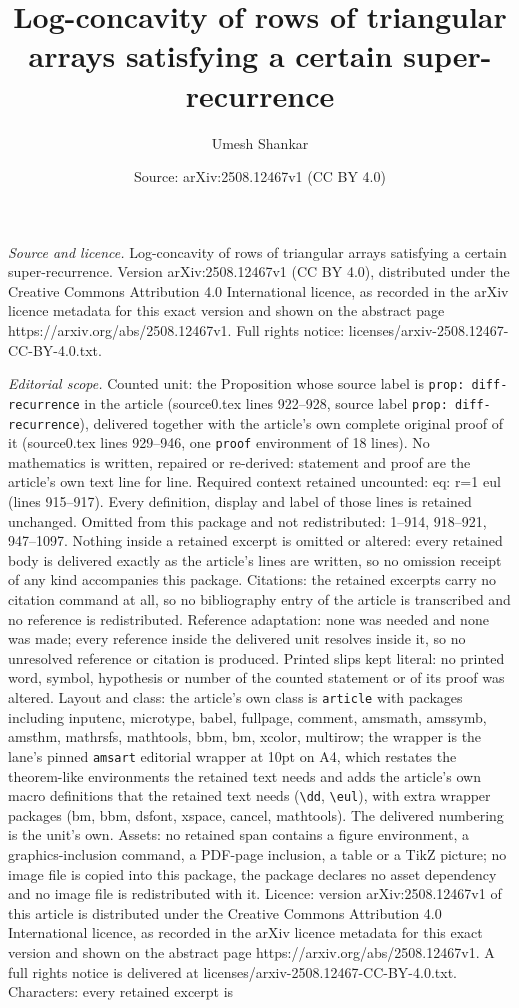 \documentclass[10pt,a4paper]{amsart}
\title[Log-concavity of rows of triangular arrays satisfying a cert]{Log-concavity of rows of triangular arrays satisfying a certain super-recurrence}
\author{Umesh Shankar}
\date{Source: arXiv:2508.12467v1 (CC BY 4.0)}
\begin{document}
\maketitle

\noindent\emph{Source and licence.} Log-concavity of rows of triangular arrays satisfying a certain super-recurrence. Version arXiv:2508.12467v1 (CC BY 4.0), distributed under the Creative Commons Attribution 4.0 International licence, as recorded in the arXiv licence metadata for this exact version and shown on the abstract page https://arxiv.org/abs/2508.12467v1. Full rights notice: licenses/arxiv-2508.12467-CC-BY-4.0.txt.\par\smallskip

\noindent\textit{Editorial scope.} Counted unit: the Proposition whose source label is \texttt{prop: diff-recurrence} in the article (source0.tex lines 922--928, source label \texttt{prop: diff-recurrence}), delivered together with the article's own complete original proof of it (source0.tex lines 929--946, one \texttt{proof} environment of 18 lines). No mathematics is written, repaired or re-derived: statement and proof are the article's own text line for line. Required context retained uncounted: eq: r=1 eul (lines 915--917). Every definition, display and label of those lines is retained unchanged. Omitted from this package and not redistributed: 1--914, 918--921, 947--1097. Nothing inside a retained excerpt is omitted or altered: every retained body is delivered exactly as the article's lines are written, so no omission receipt of any kind accompanies this package. Citations: the retained excerpts carry no citation command at all, so no bibliography entry of the article is transcribed and no reference is redistributed. Reference adaptation: none was needed and none was made; every reference inside the delivered unit resolves inside it, so no unresolved reference or citation is produced. Printed slips kept literal: no printed word, symbol, hypothesis or number of the counted statement or of its proof was altered. Layout and class: the article's own class is \texttt{article} with packages including inputenc, microtype, babel, fullpage, comment, amsmath, amssymb, amsthm, mathrsfs, mathtools, bbm, bm, xcolor, multirow; the wrapper is the lane's pinned \texttt{amsart} editorial wrapper at 10pt on A4, which restates the theorem-like environments the retained text needs and adds the article's own macro definitions that the retained text needs (\texttt{\textbackslash dd}, \texttt{\textbackslash eul}), with extra wrapper packages (bm, bbm, dsfont, xspace, cancel, mathtools). The delivered numbering is the unit's own. Assets: no retained span contains a figure environment, a graphics-inclusion command, a PDF-page inclusion, a table or a TikZ picture; no image file is copied into this package, the package declares no asset dependency and no image file is redistributed with it. Licence: version arXiv:2508.12467v1 of this article is distributed under the Creative Commons Attribution 4.0 International licence, as recorded in the arXiv licence metadata for this exact version and shown on the abstract page https://arxiv.org/abs/2508.12467v1. A full rights notice is delivered at licenses/arxiv-2508.12467-CC-BY-4.0.txt. Characters: every retained excerpt is 
\end{document}
